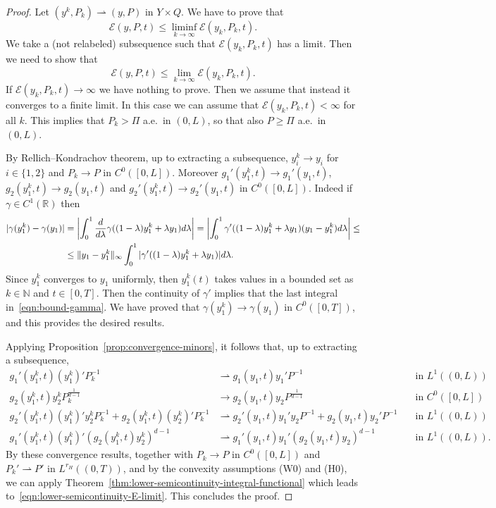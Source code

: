\documentclass[a4paper,10pt,oneside]{amsbook}
\numberwithin{section}{chapter}
\numberwithin{equation}{chapter}
\theoremstyle{definition}
\DeclarePairedDelimiter{\norm}{\lVert}{\rVert}
\begin{document}
\begin{proof}
Let $(y^k,P_k)\rightharpoonup(y,P)$ in $Y\times Q$. We have to prove that
\[
\mathcal{E}(y,P,t)\le\liminf_{k\to\infty}\mathcal{E}(y_k,P_k,t).
\]
We take a (not relabeled) subsequence such that $\mathcal{E}(y_k,P_k,t)$ has a limit. Then we need to show that
\begin{equation}
\label{eqn:lower-semicontinuity-E-limit}
\mathcal{E}(y,P,t)\le\lim_{k\to\infty}\mathcal{E}(y_k,P_k,t).
\end{equation}
If $\mathcal{E}(y_k,P_k,t)\to\infty$ we have nothing to prove. Then we assume that instead it converges to a finite limit. In this case we can assume that $\mathcal{E}(y_k,P_k,t)<\infty$ for all $k$. This implies that $P_k>\Pi$ a.e.\ in $(0,L)$, so that also $P\ge \Pi$ a.e.\ in $(0,L)$.

By Rellich--Kondrachov theorem, up to extracting a subsequence, $y_i^k\to y_i$ for $i\in\{1,2\}$ and $P_k\to P$ in $C^0([0,L])$.  Moreover $g_1'(y_1^k,t)\to g_1'(y_1,t)$, $g_2(y_1^k,t)\to g_2(y_1,t)$ and $g_2'(y_1^k,t)\to g_2'(y_1,t)$ in $C^0([0,L])$. Indeed if $\gamma\in C^1(\mathbb{R})$ then
\begin{equation}
\label{eqn:bound-gamma}
\begin{split}
|\gamma(y_1^k)-\gamma(y_1)|&=\left|\int_0^1\frac{d}{d\lambda}\gamma((1-\lambda)y_1^k+\lambda y_1)d\lambda\right|=\left|\int_0^1\gamma'((1-\lambda)y_1^k+\lambda y_1)(y_1-y_1^k)d\lambda\right|\le\\
&\le\norm{y_1-y_1^k}_\infty\int_0^1|\gamma'((1-\lambda)y_1^k+\lambda y_1)|d\lambda.
\end{split}
\end{equation}
Since $y_1^k$ converges to $y_1$ uniformly, then $y_1^k(t)$ takes values in a bounded set as $k\in\mathbb{N}$ and $t\in[0,T]$. Then the continuity of $\gamma'$ implies that the last integral in~\eqref{eqn:bound-gamma}. We have proved that $\gamma(y_1^k)\to\gamma(y_1)$ in $C^0([0,T])$, and this provides the desired results.

Applying Proposition~\ref{prop:convergence-minors}, it follows that, up to extracting a subsequence,
\begin{align*}
g_1'(y_1^k,t)(y_1^k)'P_k^{-1}&\rightharpoonup g_1(y_1,t)y_1'P^{-1}\quad&\text{in $L^1((0,L))$} \\
g_2(y_1^k,t)y_2^kP_k^\frac{1}{d-1}&\to g_2(y_1,t)y_2P^\frac{1}{d-1}\quad&\text{in $C^0([0,L])$} \\
g_2'(y_1^k,t)(y_1^k)'y_2^kP_k^{-1}+g_2(y_1^k,t)(y_2^k)'P_k^{-1}&\rightharpoonup g_2'(y_1,t)y_1'y_2P^{-1}+g_2(y_1,t)y_2'P^{-1}\quad&\text{in $L^1((0,L))$} \\
g_1'(y_1^k,t)(y_1^k)'(g_2(y_1^k,t)y_2^k)^{d-1}&\rightharpoonup g_1'(y_1,t)y_1'(g_2(y_1,t)y_2)^{d-1}\quad&\text{in $L^1((0,L))$}.
\end{align*}
By these convergence results, together with $P_k\to P$ in $C^0([0,L])$ and $P_k'\rightharpoonup P'$ in $L^{r_H}((0,T))$, and by the convexity assumptions (W0) and (H0), we can apply Theorem~\ref{thm:lower-semicontinuity-integral-functional} which leads to~\eqref{eqn:lower-semicontinuity-E-limit}. This concludes the proof.
\end{proof}
\end{document}
